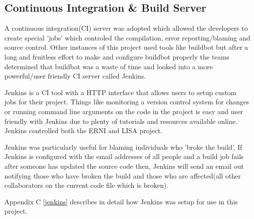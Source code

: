 \subsection{Continuous Integration \& Build Server}

A continuous integration(CI) server was adopted which allowed the developers to create special 'jobs' which  controled the compilation, error reporting/blaming and source control. Other instances of this project used tools like buildbot but after a long and fruitless effort to make and configure buildbot properly the teams determined that buildbot was a waste of time and looked into a more powerful/user friendly CI server called Jenkins. 

Jenkins is a CI tool with a HTTP interface that allows users to setup custom jobs for their project. Things like monitoring a version control system for changes or running command line arguments on the code in the project is easy and user friendly with Jenkins due to plenty of tutorials and resources available online. Jenkins controlled both the ERNI and LISA project. 

Jenkins was particularly useful for blaming individuals who 'broke the build'. If Jenkins is configured with the email addresses of all people and a build job fails after someone has updated the source code then, Jenkins will send an email out notifying those who have broken the build and those who are affected(all other collaborators on the current code file which is broken).

Appendix C \ref{jenkins} describes in detail how Jenkins was setup for use in this project.
